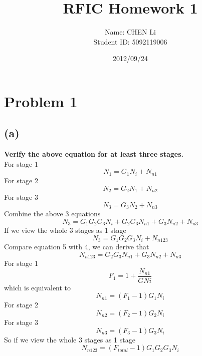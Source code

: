 \documentclass[12pt,a4paper]{article}
\begin{document}
\title{RFIC Homework 1}
\author{
Name: CHEN Li  \\Student ID: 5092119006
}

\date{2012/09/24}
\maketitle

\section*{Problem 1}
\subsection*{(a)}
\textbf{Verify the above equation for at least three stages.}\\
\newline
For stage 1
\begin{equation}
N_1=G_1N_i+N_{n1}
\end{equation}
For stage 2
\begin{equation}
N_2=G_2N_1+N_{n2}
\end{equation}
For stage 3
\begin{equation}
N_3=G_3N_2+N_{n3}
\end{equation}
Combine the above 3 equations
\begin{equation}
N_3=G_1G_2G_3N_i+G_2G_3N_{n1}+G_3N_{n2}+N_{n3}
\end{equation}
If we view  the whole 3 stages as 1 stage
\begin{equation}
N_3=G_1G_2G_3N_i+N_{n123}
\end{equation}
Compare equation 5 with 4, we can derive that 
\begin{equation}
N_{n123}=G_2G_3N_{n1}+G_3N_{n2}+N_{n3}
\end{equation}
\newline
For stage 1
\begin{equation}
F_1=1+\frac{N_{n1}}{GNi}
\end{equation}
which is equivalent to
\begin{equation}
N_{n1}=(F_1-1)G_1N_i
\end{equation}
For stage 2
\begin{equation}
N_{n2}=(F_2-1)G_2N_i
\end{equation}
For stage 3
\begin{equation}
N_{n3}=(F_3-1)G_3N_i
\end{equation}
So if we view  the whole 3 stages as 1 stage
\begin{equation}
N_{n123}=(F_{total}-1)G_1G_2G_3N_i
\end{equation}
\end{document}
